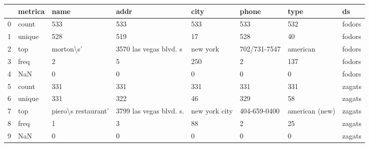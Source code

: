 \begin{tabular}{llllllll}
\toprule
{} & metrica &                 name &                     addr &           city &         phone &            type &      ds \\
\midrule
0 &   count &                  533 &                      533 &            533 &           533 &             532 &  fodors \\
1 &  unique &                  528 &                      519 &             17 &           528 &              40 &  fodors \\
2 &     top &            morton\textbackslash s' &   3570 las vegas blvd. s &       new york &  702/731-7547 &        american &  fodors \\
3 &    freq &                    2 &                        5 &            250 &             2 &             137 &  fodors \\
4 &     NaN &                    0 &                        0 &              0 &             0 &               0 &  fodors \\
5 &   count &                  331 &                      331 &            331 &           331 &             331 &  zagats \\
6 &  unique &                  331 &                      322 &             46 &           329 &              58 &  zagats \\
7 &     top &  piero\textbackslash s restaurant' &  3799 las vegas blvd. s. &  new york city &  404-659-0400 &  american (new) &  zagats \\
8 &    freq &                    1 &                        3 &             88 &             2 &              25 &  zagats \\
9 &     NaN &                    0 &                        0 &              0 &             0 &               0 &  zagats \\
\bottomrule
\end{tabular}

